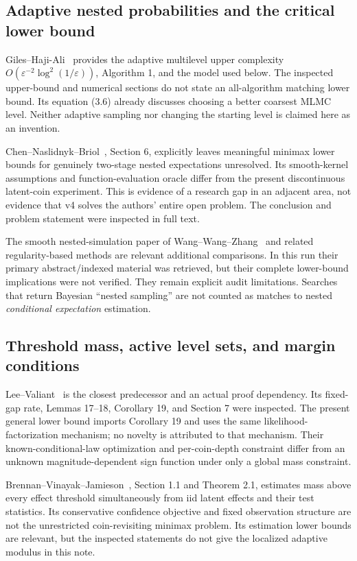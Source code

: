 \documentclass[11pt]{article}
\theoremstyle{definition}\newtheorem{conjecture}[theorem]{Conjecture}
\theoremstyle{remark}\newtheorem{remark}[theorem]{Remark}
\begin{document}
\subsection{Adaptive nested probabilities and the critical lower bound}
Giles--Haji-Ali~\cite{gha} provides the adaptive multilevel upper complexity $O(\varepsilon^{-2}\log^2(1/\varepsilon))$, Algorithm 1, and the model used below. The inspected upper-bound and numerical sections do not state an all-algorithm matching lower bound. Its equation (3.6) already discusses choosing a better coarsest MLMC level. Neither adaptive sampling nor changing the starting level is claimed here as an invention.

Chen--Naslidnyk--Briol~\cite{chen}, Section 6, explicitly leaves meaningful minimax lower bounds for genuinely two-stage nested expectations unresolved. Its smooth-kernel assumptions and function-evaluation oracle differ from the present discontinuous latent-coin experiment. This is evidence of a research gap in an adjacent area, not evidence that v4 solves the authors' entire open problem. The conclusion and problem statement were inspected in full text.

The smooth nested-simulation paper of Wang--Wang--Zhang~\cite{wang} and related regularity-based methods are relevant additional comparisons. In this run their primary abstract/indexed material was retrieved, but their complete lower-bound implications were not verified. They remain explicit audit limitations. Searches that return Bayesian ``nested sampling'' are not counted as matches to nested \emph{conditional expectation} estimation.

\subsection{Threshold mass, active level sets, and margin conditions}
Lee--Valiant~\cite{lv} is the closest predecessor and an actual proof dependency. Its fixed-gap rate, Lemmas 17--18, Corollary 19, and Section 7 were inspected. The present general lower bound imports Corollary 19 and uses the same likelihood-factorization mechanism; no novelty is attributed to that mechanism. Their known-conditional-law optimization and per-coin-depth constraint differ from an unknown magnitude-dependent sign function under only a global mass constraint.

Brennan--Vinayak--Jamieson~\cite{brennan}, Section 1.1 and Theorem 2.1, estimates mass above every effect threshold simultaneously from iid latent effects and their test statistics. Its conservative confidence objective and fixed observation structure are not the unrestricted coin-revisiting minimax problem. Its estimation lower bounds are relevant, but the inspected statements do not give the localized adaptive modulus in this note.
\end{document}
